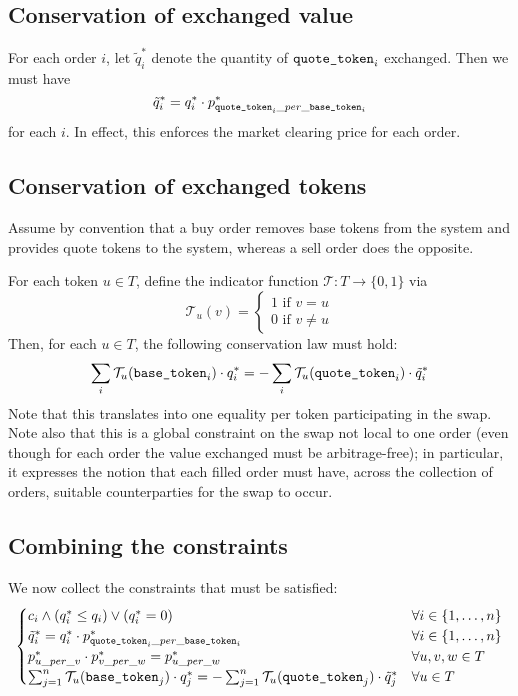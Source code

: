 \documentclass[11pt, reqno]{amsart}
\newcommand{\basetoken}{\textnormal{\texttt{base\_token}}}
\newcommand{\quotetoken}{\textnormal{\texttt{quote\_token}}}
\begin{document}
\subsection{Conservation of exchanged value}

For each order $i$, let $\tilde{q}_i^*$ denote the quantity of
$\quotetoken_i$ exchanged. Then we must have
\[
    \tilde{q}_i^* = q_i^* \cdot p_{\quotetoken_i\_per\_\basetoken_i}^*
\]
for each $i$. In effect, this enforces the market clearing price for each
order.

\subsection{Conservation of exchanged tokens}

Assume by convention that a buy order removes base tokens from the system and
provides quote tokens to the system, whereas a sell order does the opposite.

For each token $u \in T$, define the indicator function
$\mathcal{T}: T \to \{0, 1\}$ via
\[
    \mathcal{T}_u(v) =
    \begin{cases}
    1 \text{ if } v = u \\
    0 \text{ if } v \neq u
    \end{cases}
\]
Then, for each $u \in T$, the following conservation law must hold:
\[
    \sum_i \mathcal{T}_u(\basetoken_i) \cdot q^*_i
    =
    - \sum_i \mathcal{T}_u(\quotetoken_i) \cdot \tilde{q}_i^*
\]
Note that this translates into one equality per token participating in the
swap. Note also that this is a global constraint on the swap not local to one
order (even though for each order the value exchanged must be arbitrage-free);
in particular, it expresses the notion that each filled order must have,
across the collection of orders, suitable counterparties for the swap to occur.

\subsection{Combining the constraints}

We now collect the constraints that must be satisfied:
\begin{equation}
  \begin{cases}
    c_i \land (q_i^* \leq q_i) \lor (q_i^* = 0)
      & \forall i \in \{1, \ldots, n\} \\
    \tilde{q}_i^* = q_i^* \cdot p_{\quotetoken_i\_per\_\basetoken_i}^*
      & \forall i \in \{1, \ldots, n\} \\
    p^*_{u\_per\_v} \cdot p^*_{v\_per\_w} = p^*_{u\_per\_w}
      & \forall u, v, w \in T \\
    \sum_{j = 1}^n \mathcal{T}_u(\basetoken_j) \cdot q^*_j
    =
      - \sum_{j = 1}^n \mathcal{T}_u(\quotetoken_j) \cdot \tilde{q}_j^*
      & \forall u \in T
  \end{cases}
\end{equation}
\end{document}
